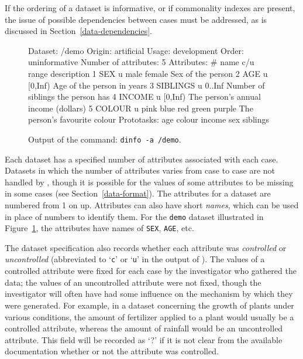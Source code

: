 If the ordering of a dataset is informative, or if commonality indexes
are present, the issue of possible dependencies between cases must be
addressed, as is discussed in Section~\ref{data-dependencies}.

\begin{figure}[t]
\begin{Session}
Dataset: /demo
Origin: artificial
Usage: development
Order: uninformative
Number of attributes: 5
Attributes: 
     #  name     c/u range        description
     1  SEX       u  male female  Sex of the person
     2  AGE       u  [0,Inf)      Age of the person in years
     3  SIBLINGS  u  0..Inf       Number of siblings the person has
     4  INCOME    u  [0,Inf)      The person's annual income (dollars)
     5  COLOUR    u  pink blue red green purple 
                                  The person's favourite colour
Prototasks: 
        age
        colour
        income
        sex
        siblings
\end{Session}\vspace{-4pt}
\caption{Output of the command: \texttt{dinfo -a /demo}.}
\label{fig:dataset-dinfo-a}
\end{figure}

Each dataset has a specified number of attributes associated with each
case.  Datasets in which the number of attributes varies from case to
case are not handled by \delve, though it is possible for the values
of some attributes to be missing in some cases (see
Section~\ref{data-format}).  The attributes for a dataset are numbered
from 1 on up.  Attributes can also have short {\em names}, which can
be used in place of numbers to identify them.  For the \texttt{demo}
dataset illustrated in Figure~\ref{fig:dataset-dinfo-a}, the attributes
have names of \texttt{SEX}, \texttt{AGE}, etc.

The dataset specification also records whether each attribute was
\emph{controlled} or \emph{uncontrolled} (abbreviated to `{\tt c}'
or `{\tt u}' in the output of \dinfo).  The values of a controlled
attribute were fixed for each case by the investigator who gathered
the data; the values of an uncontrolled attribute were not fixed,
though the investigator will often have had some influence on the
mechanism by which they were generated.  For example, in a dataset
concerning the growth of plants under various conditions, the amount
of fertilizer applied to a plant would usually be a controlled
attribute, whereas the amount of rainfall would be an uncontrolled
attribute.  This field will be recorded as `?' if it is not clear from
the available documentation whether or not the attribute was
controlled.

